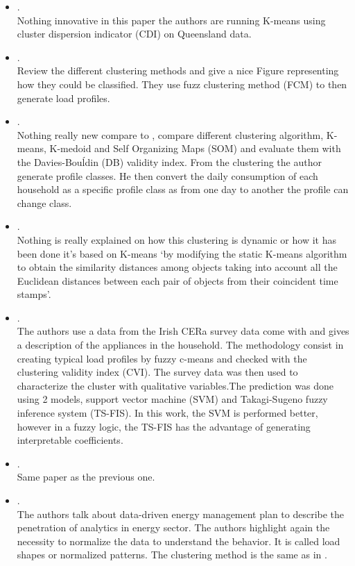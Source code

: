 \begin{itemize}
	\item {}.\\
	 Nothing innovative in this paper the authors are running K-means using cluster dispersion indicator (CDI) on Queensland data.
	\item {}.\\
	 Review the different clustering methods and give a nice Figure representing how they could be classified. They use fuzz clustering method (FCM) to then generate load profiles.
	\item {}.\\
	 Nothing really new compare to \citeauthor{Panapakidis2015}, compare different clustering algorithm, K-means, K-medoid and Self Organizing Maps (SOM) and evaluate them with the Davies-Bouĺdin (DB) validity index. From the clustering the author generate profile classes. He then convert the daily consumption of each household as a specific profile class as from one day to another the profile can change class.
	\item {}.\\
	 Nothing is really explained on how this clustering is dynamic or how it has been done it's based on K-means `by modifying the static K-means algorithm to obtain the similarity distances among objects taking into account all the Euclidean distances between each pair of objects from their coincident time stamps'.
	\item {}.\\
	 The authors use a data from the Irish CER\@ a survey data come with and gives a description of the appliances in the household. The methodology consist in creating typical load profiles by fuzzy c-means and checked with the clustering validity index (CVI). The survey data was then used to characterize the cluster with qualitative variables.The prediction was done using 2 models, support vector machine (SVM) and Takagi-Sugeno fuzzy inference system (TS-FIS). In this work, the SVM is performed better, however in a fuzzy logic, the TS-FIS has the advantage of generating interpretable coefficients.
	\item {}.\\
	 Same paper as the previous one.
	\item {}.\\
	 The authors talk about data-driven energy management plan to describe the penetration of analytics in energy sector. The authors highlight again the necessity to normalize the data to understand the behavior. It is called load shapes or normalized patterns. The clustering method is the same as in \cite{Kwac2014}.

\end{itemize}
